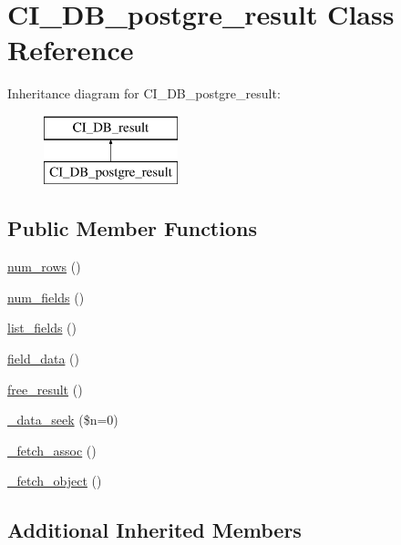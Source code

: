 \hypertarget{class_c_i___d_b__postgre__result}{\section{C\-I\-\_\-\-D\-B\-\_\-postgre\-\_\-result Class Reference}
\label{class_c_i___d_b__postgre__result}
}
Inheritance diagram for C\-I\-\_\-\-D\-B\-\_\-postgre\-\_\-result\-:\begin{figure}[H]
\begin{center}
\leavevmode
\includegraphics[height=2.000000cm]{class_c_i___d_b__postgre__result}
\end{center}
\end{figure}
\subsection*{Public Member Functions}
\begin{DoxyCompactItemize}
\item 
\hyperlink{class_c_i___d_b__postgre__result_a218657c303ee499b97710ab0cd2f5d6e}{num\-\_\-rows} ()
\item 
\hyperlink{class_c_i___d_b__postgre__result_af831bf363e4d7d661a717a4932af449d}{num\-\_\-fields} ()
\item 
\hyperlink{class_c_i___d_b__postgre__result_a50b54eb4ea7cfd039740f532988ea776}{list\-\_\-fields} ()
\item 
\hyperlink{class_c_i___d_b__postgre__result_a84bffd65e53902ade1591716749a33e3}{field\-\_\-data} ()
\item 
\hyperlink{class_c_i___d_b__postgre__result_aad2d98d6beb3d6095405356c6107b473}{free\-\_\-result} ()
\item 
\hyperlink{class_c_i___d_b__postgre__result_aeba9dd69307793342d1c81ccb3e55ff9}{\-\_\-data\-\_\-seek} (\$n=0)
\item 
\hyperlink{class_c_i___d_b__postgre__result_a43a9a92817f1334a1c10752ec44275a0}{\-\_\-fetch\-\_\-assoc} ()
\item 
\hyperlink{class_c_i___d_b__postgre__result_a236bae79bb43606aa86598719b281c1f}{\-\_\-fetch\-\_\-object} ()
\end{DoxyCompactItemize}
\subsection*{Additional Inherited Members}


